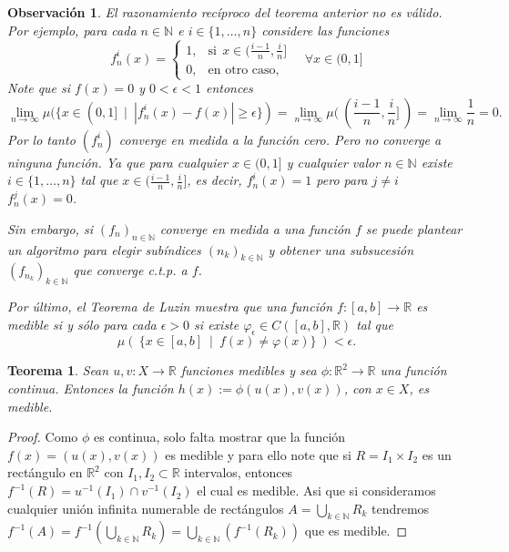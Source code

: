 \documentclass[twoside,12pt,a4 paper,openright]{book}
\newtheorem{teo}[claim]{Teorema}
\newtheorem{ob}[claim]{Observaci\'on}
\begin{document}
\begin{ob}
El razonamiento rec\'iproco del teorema anterior no es v\'alido. Por ejemplo, para cada $n\in \mathbb N$  e $i\in \{1,\dots, n\}$ considere las funciones
$$f_ n ^i (x)=\left\{ \begin{array}{ll} 1 , & \textrm{si} \ \ x\in (\frac{i-1}{n} , \frac{i}{n} ] \\ 0 , & \textrm{en otro caso,} \end{array} \right. \quad\forall x\in (0,1]$$
Note que  si $f(x)=0$ y $0<\epsilon <1$ entonces 
 $$ \lim_{n\to \infty } \mu( \{  x\in (0,1]  \ \mid \  |f_n^i(x)- f(x)| \geq \epsilon \} )=  \lim_{n\to \infty }  \mu(  \ (\frac{i-1}{n} , \frac{i}{n} ]  \  )= \lim_{n\to \infty } \frac{1}{n} =0.$$
 Por lo tanto $(f_ n ^i)$ converge en medida a la funci\'on cero. Pero no converge a ninguna funci\'on. Ya que para cualquier  $x\in (0,1]$ y cualquier valor $n\in \mathbb N$ existe $i\in \{ 1,\dots, n  \}$ tal que $x\in  (\frac{i-1}{n} , \frac{i}{n} ] $, es decir, $f_n^i(x)=1$ pero para $j\neq i$  $f_n^j(x)=0$.  
 
 Sin embargo, si $(f_n)_{n\in \mathbb N}$ converge en medida a una funci\'on $f$ se puede plantear un algoritmo para 
 elegir sub\'indices  $(n_k)_{k\in \mathbb N}$ y obtener  una subsucesi\'on $(f_{n_k})_{k\in \mathbb N}$  que converge c.t.p. a $f$. 
 
 Por \'ultimo, el Teorema de Luzin  muestra que una funci\'on $f:[a,b]\to \mathbb R$ es medible si y s\'olo 
 para cada $\epsilon >0$ si existe $\varphi_{\epsilon} \in C([a,b], \mathbb R) $ tal que $$\mu ( \  \{x\in [a,b] \ \mid \ f(x)\neq \varphi(x)\} \ )<\epsilon.$$
 
\end{ob}




\begin{teo}
    Sean $u,v:X\to\mathbb R$ funciones medibles  y sea $\phi:\mathbb R^2\to \mathbb R$ una funci\'on continua. Entonces la funci\'on  $h(x) := \phi(u(x),v(x))$, con $x\in X$,  es medible.
\end{teo}
\begin{proof}
    Como $\phi$ es continua, solo falta mostrar que la funci\'on $f(x) = (u(x),v(x))$ es medible y para ello note que si $R = I_1\times I_2$ es un rect\'angulo en $\mathbb{R}^2$ con $I_1,I_2\subset\mathbb{R}$ intervalos, entonces $f^{-1}(R) = u^{-1}(I_1)\cap v^{-1}(I_2)$ el cual es medible. Asi que si consideramos cualquier uni\'on infinita numerable de rect\'angulos $\displaystyle A = \bigcup_{k\in \mathbb{N}}R_k$ tendremos $\displaystyle f^{-1}(A) = f^{-1}\left(\bigcup_{k\in \mathbb{N}}R_k\right) = \bigcup_{k\in \mathbb{N}}(f^{-1}(R_k))$ que es medible.
\end{proof}
\end{document}
